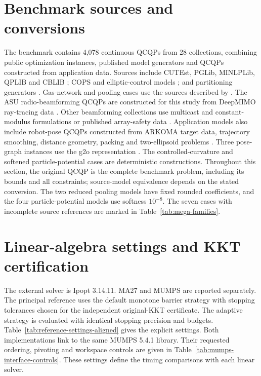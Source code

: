\documentclass[pdflatex,sn-mathphys-num]{sn-jnl}
\theoremstyle{thmstyleone}
\theoremstyle{thmstylethree}
\begin{document}
\section{Benchmark sources and conversions}\label{app:benchmark-sources}
The benchmark contains 4,078 continuous QCQPs from 28 collections,
combining public optimization instances, published model generators and
QCQPs constructed from application data. Sources include CUTEst, PGLib,
MINLPLib, QPLIB and CBLIB
\citep{GouldOrbanToint2015,PGLib2019,BussieckDrudMeeraus2003,
FuriniEtAl2019QPLIB,Friberg2016CBLIB}; COPS and elliptic-control models
\citep{DolanMoreMunson2004COPS,MaurerMittelmann2000Boundary,
MittelmannMaurer2000}; and partitioning generators
\citep{KannanNagarajanDeka2025,KannanNagarajanDeka2025Data}.
Gas-network and pooling cases use the sources described by
\citet{SchmidtEtAl2017GasLib,GasPowerModels2026,LuedtkeEtAl2020Pooling,
Ceccon2020PoolingNetwork}. The ASU radio-beamforming QCQPs are constructed
for this study from DeepMIMO ray-tracing data \citep{Alkhateeb2019DeepMIMO}.
Other beamforming collections use multicast and constant-modulus
formulations or published array-safety data
\citep{SidiropoulosDavidsonLuo2006,He2021ConstantModulus,
BalajiLiCabric2026Data}. Application models also include robot-pose QCQPs
constructed from ARKOMA target data, trajectory smoothing, distance
geometry, packing and two-ellipsoid problems
\citep{NugrohoYuniarnoPurnomo2023Data,LiuEtAl2017Trajectory,
GiamouEtAl2022CIDGIK,Khajavirad2024Packing,MontanherNeumaierDomes2018}.
Three pose-graph instances use the g2o representation
\citep{KuemmerleEtAl2011G2O}. The controlled-curvature and softened
particle-potential cases are deterministic constructions. Throughout this section, the original QCQP
is the complete benchmark problem, including its bounds and all
constraints; source-model equivalence depends on the stated conversion.
The two reduced pooling models have fixed rounded coefficients, and the
four particle-potential models use softness $10^{-8}$. The seven cases with incomplete source references are marked in Table~\ref{tab:mega-families}.



\FloatBarrier
\section{Linear-algebra settings and KKT certification}\label{app:ipopt-protocol}
The external solver is Ipopt 3.14.11. MA27 and MUMPS are reported
separately. The principal reference uses the default monotone barrier
strategy with stopping tolerances chosen for the independent original-KKT
certificate. The adaptive strategy is evaluated with identical stopping
precision and budgets. Table~\ref{tab:reference-settings-aligned} gives
the explicit settings. Both implementations link to the same MUMPS
5.4.1 library. Their requested ordering, pivoting and workspace controls
are given in Table~\ref{tab:mumps-interface-controls}. These
settings define the timing comparisons with each linear solver.
\end{document}
